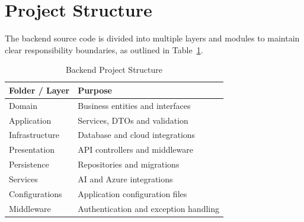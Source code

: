 \section{Project Structure}
\label{sec:backend-project-structure}

The backend source code is divided into multiple layers and modules to maintain clear responsibility boundaries, as outlined in Table~\ref{tab:backend-project-structure}.

\begin{table}[H]
\centering
\caption{Backend Project Structure}
\label{tab:backend-project-structure}
\renewcommand{\arraystretch}{1.3}

\begin{tabularx}{0.95\textwidth}{|p{4cm}|X|}
\hline
\textbf{Folder / Layer} & \textbf{Purpose} \\
\hline

Domain & Business entities and interfaces \\

\hline

Application & Services, DTOs and validation \\

\hline

Infrastructure & Database and cloud integrations \\

\hline

Presentation & API controllers and middleware \\

\hline

Persistence & Repositories and migrations \\

\hline

Services & AI and Azure integrations \\

\hline

Configurations & Application configuration files \\

\hline

Middleware & Authentication and exception handling \\

\hline

\end{tabularx}

\end{table}

